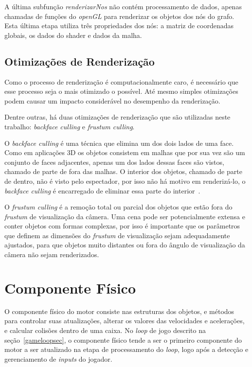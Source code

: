 A última subfunção \textit{renderizarNos} não contém processamento 
de dados, apenas chamadas de funções do \textit{openGL} para renderizar 
os objetos dos nós do grafo. Esta última etapa utiliza três propriedades 
dos nós: a matriz de coordenadas globais, os dados do shader e dados da 
malha.

\subsection{Otimizações de Renderização}

Como o processo de renderização é computacionalmente caro, é necessário que esse 
processo seja o mais otimizado o possível. Até mesmo simples otimizações podem causar 
um impacto considerável no desempenho da renderização. 

Dentre outras, há duas otimizações de renderização que são utilizadas neste trabalho: 
\textit{backface culling} e \textit{frustum culling}.

O \textit{backface culling} é uma técnica que elimina um dos dois lados de uma face. 
Como em aplicações 3D os objetos consistem em malhas que por sua vez são um conjunto 
de faces adjacentes, apenas um dos lados dessas faces são vistos, chamado de parte de 
fora das malhas. O interior dos objetos, chamado de parte de dentro, não é visto pelo 
espectador, por isso não há motivo em renderizá-lo, o \textit{backface culling} é 
encarregado de eliminar essa parte do interior~\cite{hughes2014computer}.

O \textit{frustum culling} é a remoção total ou parcial dos objetos que estão fora do 
\textit{frustum} de visualização da câmera. Uma cena pode ser potencialmente extensa e 
conter objetos com formas complexas, por isso é importante que os parâmetros que 
definem as dimensões do \textit{frustum} de visualização sejam adequadamente ajustados, 
para que objetos muito distantes ou fora do ângulo de visualização da câmera não sejam 
renderizados.

\section{Componente Físico}

O componente físico do motor consiste nas estruturas dos objetos, e métodos para 
controlar suas atualizações, alterar os valores das velocidades e acelerações, e 
calcular colisões dentro de uma caixa. No \textit{loop} de jogo descrito na 
seção~\ref{gameloopsec}, o componente físico tende a ser o primeiro componente 
do motor a ser atualizado na etapa de processamento do \textit{loop}, logo 
após a detecção e gerenciamento de \textit{inputs} do jogador.


